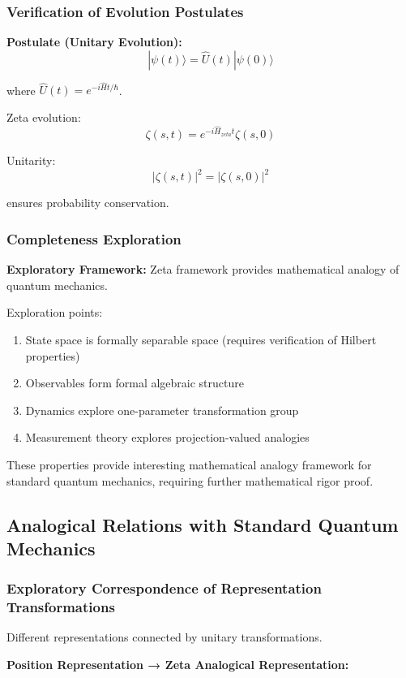 \documentclass[11pt]{article}
\theoremstyle{plain}
\theoremstyle{definition}
\theoremstyle{remark}
\begin{document}
\subsubsection{Verification of Evolution Postulates}

\textbf{Postulate (Unitary Evolution):}
$$|\psi(t)\rangle = \hat{U}(t)|\psi(0)\rangle$$

where $\hat{U}(t) = e^{-i\hat{H}t/\hbar}$.

Zeta evolution:
$$\zeta(s,t) = e^{-i\hat{H}_{zeta}t} \zeta(s,0)$$

Unitarity:
$$|\zeta(s,t)|^2 = |\zeta(s,0)|^2$$

ensures probability conservation.

\subsubsection{Completeness Exploration}

\textbf{Exploratory Framework:} Zeta framework provides mathematical analogy of quantum mechanics.

Exploration points:
\begin{enumerate}
\item State space is formally separable space (requires verification of Hilbert properties)
\item Observables form formal algebraic structure
\item Dynamics explore one-parameter transformation group
\item Measurement theory explores projection-valued analogies
\end{enumerate}

These properties provide interesting mathematical analogy framework for standard quantum mechanics, requiring further mathematical rigor proof.

\subsection{Analogical Relations with Standard Quantum Mechanics}

\subsubsection{Exploratory Correspondence of Representation Transformations}

Different representations connected by unitary transformations.

\textbf{Position Representation → Zeta Analogical Representation:}
\end{document}
